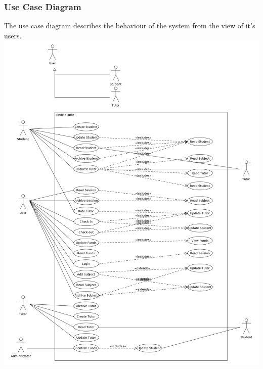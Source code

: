\documentclass[12pt]{article}
\begin{document}
\subsubsection{Use Case Diagram}
The use case diagram describes the behaviour of the system from the view of it's users.\\
\includegraphics[width=170mm]{./Use_Case_Diagram.png}
\end{document}
